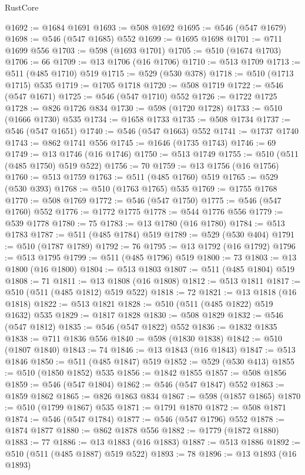\begin{lexlean}{RustCore}
\begin{coremodule}
@1692 := @1684 @1691
@1693 := @508 @1692
@1695 := @546 (@547 @1679)
@1698 := @546 (@547 @1685) @552
@1699 := @1695 @1698
@1701 := @711 @1699 @556
@1703 := @598 (@1693 @1701)
@1705 := @510 (@1674 @1703)
@1706 := 66
@1709 := @13 @1706 (@16 @1706)
@1710 := @513 @1709
@1713 := @511 (@485 @1710) @519
@1715 := @529 (@530 @378)
@1718 := @510 (@1713 @1715) @535
@1719 := @1705 @1718
@1720 := @508 @1719
@1722 := @546 (@547 @1671)
@1725 := @546 (@547 @1710) @552
@1726 := @1722 @1725
@1728 := @826 @1726 @834
@1730 := @598 (@1720 @1728)
@1733 := @510 (@1666 @1730) @535
@1734 := @1658 @1733
@1735 := @508 @1734
@1737 := @546 (@547 @1651)
@1740 := @546 (@547 @1663) @552
@1741 := @1737 @1740
@1743 := @862 @1741 @556
@1745 := @1646 (@1735 @1743)
@1746 := 69
@1749 := @13 @1746 (@16 @1746)
@1750 := @513 @1749
@1755 := @510 (@511 (@485 @1750) @519 @522)
@1756 := 70
@1759 := @13 @1756 (@16 @1756)
@1760 := @513 @1759
@1763 := @511 (@485 @1760) @519
@1765 := @529 (@530 @393)
@1768 := @510 (@1763 @1765) @535
@1769 := @1755 @1768
@1770 := @508 @1769
@1772 := @546 (@547 @1750)
@1775 := @546 (@547 @1760) @552
@1776 := @1772 @1775
@1778 := @544 @1776 @556
@1779 := @539 @1778
@1780 := 75
@1783 := @13 @1780 (@16 @1780)
@1784 := @513 @1783
@1787 := @511 (@485 @1784) @519
@1789 := @529 (@530 @404)
@1791 := @510 (@1787 @1789)
@1792 := 76
@1795 := @13 @1792 (@16 @1792)
@1796 := @513 @1795
@1799 := @511 (@485 @1796) @519
@1800 := 73
@1803 := @13 @1800 (@16 @1800)
@1804 := @513 @1803
@1807 := @511 (@485 @1804) @519
@1808 := 71
@1811 := @13 @1808 (@16 @1808)
@1812 := @513 @1811
@1817 := @510 (@511 (@485 @1812) @519 @522)
@1818 := 72
@1821 := @13 @1818 (@16 @1818)
@1822 := @513 @1821
@1828 := @510 (@511 (@485 @1822) @519 @1632) @535
@1829 := @1817 @1828
@1830 := @508 @1829
@1832 := @546 (@547 @1812)
@1835 := @546 (@547 @1822) @552
@1836 := @1832 @1835
@1838 := @711 @1836 @556
@1840 := @598 (@1830 @1838)
@1842 := @510 (@1807 @1840)
@1843 := 74
@1846 := @13 @1843 (@16 @1843)
@1847 := @513 @1846
@1850 := @511 (@485 @1847) @519
@1852 := @529 (@530 @413)
@1855 := @510 (@1850 @1852) @535
@1856 := @1842 @1855
@1857 := @508 @1856
@1859 := @546 (@547 @1804)
@1862 := @546 (@547 @1847) @552
@1863 := @1859 @1862
@1865 := @826 @1863 @834
@1867 := @598 (@1857 @1865)
@1870 := @510 (@1799 @1867) @535
@1871 := @1791 @1870
@1872 := @508 @1871
@1874 := @546 (@547 @1784)
@1877 := @546 (@547 @1796) @552
@1878 := @1874 @1877
@1880 := @862 @1878 @556
@1882 := @1779 (@1872 @1880)
@1883 := 77
@1886 := @13 @1883 (@16 @1883)
@1887 := @513 @1886
@1892 := @510 (@511 (@485 @1887) @519 @522)
@1893 := 78
@1896 := @13 @1893 (@16 @1893)

\end{coremodule}
\end{lexlean}
